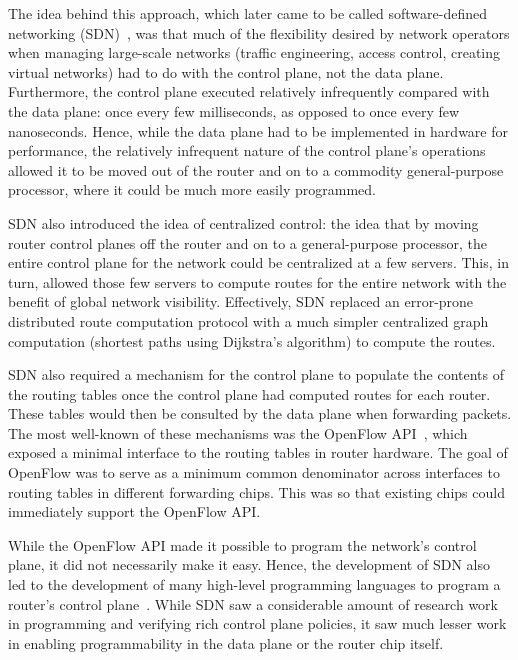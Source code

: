 The idea behind this approach, which later came to be called software-defined
networking (SDN)~\cite{sdn_coining}, was that much of the flexibility desired
by network operators when managing large-scale networks (\eg traffic
engineering, access control, creating virtual networks) had to do with the
control plane, not the data plane.  Furthermore, the control plane executed
relatively infrequently compared with the data plane: once every few
milliseconds, as opposed to once every few nanoseconds. Hence, while the data
plane had to be implemented in hardware for performance, the relatively
infrequent nature of the control plane's operations allowed it to be moved out
of the router and on to a commodity general-purpose processor, where it could
be much more easily programmed.

SDN also introduced the idea of centralized control: the idea that by moving
router control planes off the router and on to a general-purpose processor, the
entire control plane for the network could be centralized at a few servers.
This, in turn, allowed those few servers to compute routes for the entire
network with the benefit of global network visibility. Effectively, SDN
replaced an error-prone distributed route computation protocol with a much
simpler centralized graph computation (\eg shortest paths using Dijkstra's
algorithm) to compute the routes.

SDN also required a mechanism for the control plane to populate the contents of
the routing tables once the control plane had computed routes for each router.
These tables would then be consulted by the data plane when forwarding packets.
The most well-known of these mechanisms was the OpenFlow API~\cite{openflow},
which exposed a minimal interface to the routing tables in router hardware.
The goal of OpenFlow was to serve as a minimum common denominator across
interfaces to routing tables in different forwarding chips. This was so that
existing chips could immediately support the OpenFlow API.

While the OpenFlow API made it possible to program the network's control plane,
it did not necessarily make it easy. Hence, the development of SDN also led to
the development of many high-level programming languages to program a router's
control plane~\cite{frenetic, pyretic}. While SDN saw a considerable amount of
research work in programming and verifying rich control plane policies, it saw
much lesser work in enabling programmability in the data plane or the router
chip itself.

